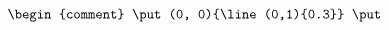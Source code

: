 \documentclass[10pt]{article}
\begin{document}
\begin{enumerate}
\begin{enumerate}
\begin{enumerate}[(i)]
      $$
      \setlength{\unitlength}{1.0cm}
      \begin{picture}(6,4)

        \begin{comment}
        \put(0, 0){\line(0,1){0.3}}
        \put(0, 0){\line(1,0){0.3}}
        \put(6, 4){\line(0,-1){0.3}}
        \put(6, 4){\line(-1,0){0.3}}
        \end{comment}

        \put(3.5, 3.7){Colin}
        \put(2.4, 3.1){\(A\)}
        \put(3.2, 3.1){\(B\)}
        \put(3.8, 3.1){\(C\)}
        \put(4.4, 3.1){\(D\)}
        \put(5.0, 3.1){\(E\)}
        \put(1.3, 3.0){\line(1,0){4.2}}

        \put(0.3, 1.75){Rose}
        \put(1.5, 2.6){\(A\)}
        \put(1.5, 2.0){\(B\)}
        \put(1.5, 1.4){\(C\)}
        \put(1.5, 0.8){\(D\)}
        \put(2.0, 0.7){\line(0,1){3.0}}

        \begin{comment}
        \put(2.5, 2.7){\vector(1,0){2.6}}

        \put(2.5, 2.1){\vector(1,0){2.0}}
        \put(5.1, 2.1){\vector(-1,0){0.5}}

        \put(2.5, 1.5){\vector(1,0){1.5}}
        \put(5.1, 1.5){\vector(-1,0){1.0}}

        \put(2.5, 0.9){\vector(1,0){1.5}}
        \put(5.1, 0.9){\vector(-1,0){1.0}}

        \put(2.5, 2.7){\vector(0,-1){0.5}}
        \put(2.5, 0.9){\vector(0,1){1.1}}
        \end{comment}

      \end{picture}
      $$


\end{enumerate}
\end{enumerate}
\end{enumerate}
\end{document}
